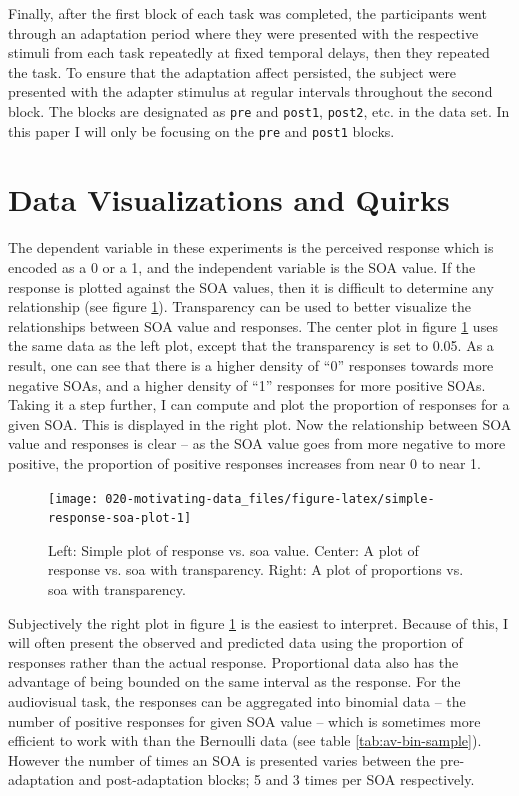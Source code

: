 \documentclass[11pt, oneside]{book}
\begin{document}
Finally, after the first block of each task was completed, the participants went through an adaptation period where they were presented with the respective stimuli from each task repeatedly at fixed temporal delays, then they repeated the task. To ensure that the adaptation affect persisted, the subject were presented with the adapter stimulus at regular intervals throughout the second block. The blocks are designated as \texttt{pre} and \texttt{post1}, \texttt{post2}, etc. in the data set. In this paper I will only be focusing on the \texttt{pre} and \texttt{post1} blocks.

\hypertarget{data-visualizations-and-quirks}{%
\section{Data Visualizations and Quirks}\label{data-visualizations-and-quirks}}

The dependent variable in these experiments is the perceived response which is encoded as a 0 or a 1, and the independent variable is the SOA value. If the response is plotted against the SOA values, then it is difficult to determine any relationship (see figure \ref{fig:simple-response-soa-plot}). Transparency can be used to better visualize the relationships between SOA value and responses. The center plot in figure \ref{fig:simple-response-soa-plot} uses the same data as the left plot, except that the transparency is set to 0.05. As a result, one can see that there is a higher density of ``0'' responses towards more negative SOAs, and a higher density of ``1'' responses for more positive SOAs. Taking it a step further, I can compute and plot the proportion of responses for a given SOA. This is displayed in the right plot. Now the relationship between SOA value and responses is clear -- as the SOA value goes from more negative to more positive, the proportion of positive responses increases from near 0 to near 1.

\begin{figure}

{\centering \texttt{[image: 020-motivating-data\_files/figure-latex/simple-response-soa-plot-1]} 

}

\caption{Left: Simple plot of response vs. soa value. Center: A plot of response vs. soa with transparency. Right: A plot of proportions vs. soa with transparency.}\label{fig:simple-response-soa-plot}
\end{figure}

Subjectively the right plot in figure \ref{fig:simple-response-soa-plot} is the easiest to interpret. Because of this, I will often present the observed and predicted data using the proportion of responses rather than the actual response. Proportional data also has the advantage of being bounded on the same interval as the response. For the audiovisual task, the responses can be aggregated into binomial data -- the number of positive responses for given SOA value -- which is sometimes more efficient to work with than the Bernoulli data (see table \ref{tab:av-bin-sample}). However the number of times an SOA is presented varies between the pre-adaptation and post-adaptation blocks; 5 and 3 times per SOA respectively.
\end{document}
